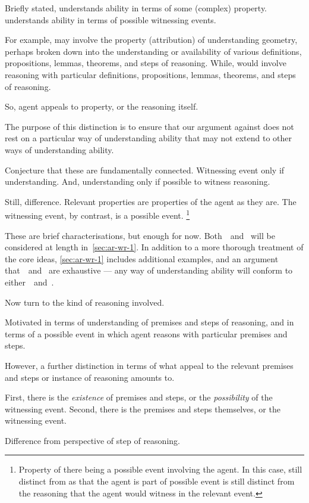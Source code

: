 \begin{note}
  Briefly stated,
  \AR{} understands ability in terms of some (complex) property.
  \WR{} understands ability in terms of possible witnessing events.

  For example, \AR{} may involve the property (attribution) of understanding geometry, perhaps broken down into the understanding or availability of various definitions, propositions, lemmas, theorems, and steps of reasoning.
  While, \WR{} would involve reasoning with particular definitions, propositions, lemmas, theorems, and steps of reasoning.

  So, agent appeals to property, or the reasoning itself.

  The purpose of this distinction is to ensure that our argument against \ESU{} does not rest on a particular way of understanding ability that may not extend to other ways of understanding ability.

  Conjecture that these are fundamentally connected.
  Witnessing event only if understanding.
  And, understanding only if possible to witness reasoning.

  Still, difference.
  Relevant properties are properties of the agent as they are.
  The witnessing event, by contrast, is a possible event.\nolinebreak
  \footnote{
    Property of there being a possible event involving the agent.
    In this case, still distinct from \WR{} as that the agent is part of possible event is still distinct from the reasoning that the agent would witness in the relevant event.
  }

  These are brief characterisations, but enough for now.
  Both~\AR{}~and~\WR{} will be considered at length in~\autoref{sec:ar-wr-1}.
  In addition to a more thorough treatment of the core ideas, \autoref{sec:ar-wr-1} includes additional examples, and an argument that~\AR{}~and~\WR{} are exhaustive --- any way of understanding ability will conform to either~\AR{}~and~\WR{}.
\end{note}

\begin{note}
  Now turn to the kind of reasoning involved.

  Motivated \AR{} in terms of understanding of premises and steps of reasoning, and \WR{} in terms of a possible event in which agent reasons with particular premises and steps.

  However, a further distinction in terms of what appeal to the relevant premises and steps or instance of reasoning amounts to.

  First, there is the \emph{existence} of premises and steps, or the \emph{possibility} of the witnessing event.
  Second, there is the premises and steps themselves, or the witnessing event.

  Difference from perspective of step of reasoning.
\end{note}


